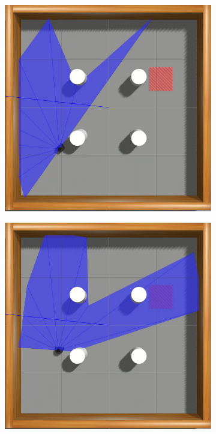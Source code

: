 \begin{figure}[htbp]
    \centering
    \begin{subfigure}[b]{0.115\textwidth}
        \includegraphics[width=\textwidth]{images/simenv2/1.png}
    \end{subfigure}
    \hfill
    \begin{subfigure}[b]{0.115\textwidth}
        \includegraphics[width=\textwidth]{images/simenv2/2.png}

\end{subfigure}
\end{figure}
